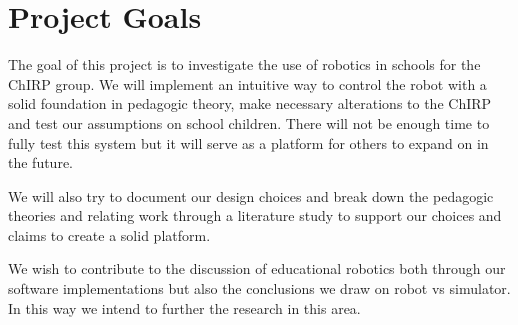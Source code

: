 \section{Project Goals}
The goal of this project is to investigate the use of robotics in schools for the ChIRP group. We will implement an intuitive way to control the robot with a solid foundation in pedagogic theory, make necessary alterations to the ChIRP and test our assumptions on school children. There will not be enough time to fully test this system but it will serve as a platform for others to expand on in the future. 

We will also try to document our design choices and break down the pedagogic theories and relating work through a literature study to support our choices and claims to create a solid platform. 

We wish to contribute to the discussion of educational robotics both through our software implementations but also the conclusions we draw on robot vs simulator. In this way we intend to further the research in this area. 
